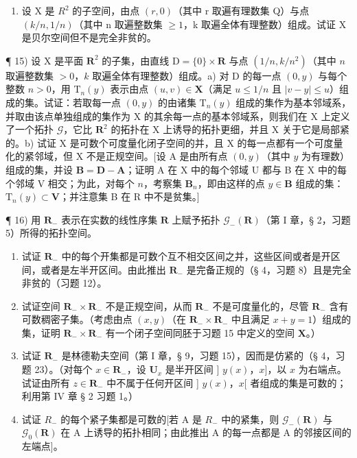 \begin{enumerate}
\def\labelenumi{\arabic{enumi})}
\setcounter{enumi}{13}
\tightlist
\item
  设 X 是 \(R^{2}\) 的子空间，由点 \((r,0)\)（其中 r 取遍有理数集 Q）与点 \((k/n,1/n)\)（其中 n 取遍整数集 \(\geqslant 1\)，k 取遍全体有理整数）组成。试证 X 是贝尔空间但不是完全非贫的。
\end{enumerate}

¶ 15) 设 X 是平面 \(\mathbf{R}^2\) 的子集，由直线 \(\mathrm{D} = \{0\} \times \mathbf{R}\) 与点 \((1/n, k/n^2)\)（其中 \(n\) 取遍整数集 \(>0\)，\(k\) 取遍全体有理整数）组成。a) 对 D 的每一点 \((0, y)\) 与每个整数 \(n > 0\)，用 \(\mathrm{T}_n(y)\) 表示由点 \((u, v) \in \mathbf{X}\)（满足 \(u \leqslant 1/n\) 且 \(|v - y| \leqslant u\)）组成的集。试证：若取每一点 \((0, y)\) 的由诸集 \(\mathrm{T}_n(y)\) 组成的集作为基本邻域系，并取由该点单独组成的集作为 X 的其余每一点的基本邻域系，则我们在 X 上定义了一个拓扑 \(\mathcal{G}\)，它比 \(\mathbf{R}^2\) 的拓扑在 X 上诱导的拓扑更细，并且 X 关于它是局部紧的。b) 试证 X 是可数个可度量化闭子空间的并，且 X 的每一点都有一个可度量化的紧邻域，但 X 不是正规空间。{[}设 A 是由所有点 \((0, y)\)（其中 \(y\) 为有理数）组成的集，并设 \(\mathbf{B} = \mathbf{D} - \mathbf{A}\)；证明 A 在 X 中的每个邻域 U 都与 B 在 X 中的每个邻域 V 相交；为此，对每个 \(n\)，考察集 \(\mathbf{B}_n\)，即由这样的点 \(y \in \mathbf{B}\) 组成的集：\(\mathrm{T}_n(y) \subset \mathbf{V}\)；并注意集 B 在 R 中不是贫集。{]}

¶ 16) 用 \(\mathbf{R}_{-}\) 表示在实数的线性序集 \(\mathbf{R}\) 上赋予拓扑 \(\mathcal{G}_{-}(\mathbf{R})\)（第 I 章，§ 2，习题 5）所得的拓扑空间。

\begin{enumerate}
\def\labelenumi{\alph{enumi})}
\item
  试证 \(\mathbf{R}_{-}\) 中的每个开集都是可数个互不相交区间之并，这些区间或者是开区间，或者是左半开区间。由此推出 \(\mathbf{R}_{-}\) 是完备正规的（§ 4，习题 8）且是完全非贫的（习题 12）。
\item
  试证空间 \(\mathbf{R}_{-} \times \mathbf{R}_{-}\) 不是正规空间，从而 \(\mathbf{R}_{-}\) 不是可度量化的，尽管 \(\mathbf{R}_{-}\) 含有可数稠密子集。（考虑由点 \((x, y)\)（在 \(\mathbf{R}_{-} \times \mathbf{R}_{-}\) 中且满足 \(x + y = 1\)）组成的集，证明 \(\mathbf{R}_{-} \times \mathbf{R}_{-}\) 有一个闭子空间同胚于习题 15 中定义的空间 \(\mathbf{X}\)。）
\item
  试证 \(\mathbf{R}_{-}\) 是林德勒夫空间（第 I 章，§ 9，习题 15），因而是仿紧的（§ 4，习题 23）。（对每个 \(x \in \mathbf{R}_{-}\)，设 \(\mathbf{U}_x\) 是半开区间 {]} \(y(x)\)，\(x]\)，以 \(x\) 为右端点。试证由所有 \(z \in \mathbf{R}_{-}\) 中不属于任何开区间 {]} \(y(x)\)，\(x[\) 者组成的集是可数的；利用第 IV 章 § 2 习题 1。）
\item
  试证 \(R_{-}\) 的每个紧子集都是可数的{[}若 A 是 \(R_{-}\) 中的紧集，则 \(\mathcal{G}_{-}(\mathbf{R})\) 与 \(\mathcal{G}_{0}(\mathbf{R})\) 在 A 上诱导的拓扑相同；由此推出 A 的每一点都是 A 的邻接区间的左端点{]}。
\end{enumerate}

